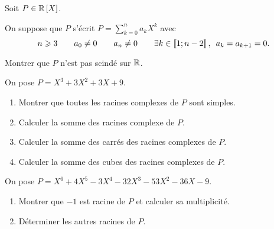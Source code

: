 \begin{exo}
Soit \(P\in\poly[\R]\).

On suppose que \(P\) s'écrit \(P=\sum_{k=0}^na_kX^k\) avec \[n\geq3\qquad a_0\not=0\qquad a_n\not=0\qquad\quantifs{\exists k\in\interventierii{1}{n-2}}a_k=a_{k+1}=0.\]

Montrer que \(P\) n'est pas scindé sur \(\mathbb{R}\).
\end{exo}

\begin{corr}
\end{corr}

\begin{exo}
On pose \(P=X^3+3X^2+3X+9\).

\begin{enumerate}
\item Montrer que toutes les racines complexes de \(P\) sont simples. \\

\item Calculer la somme des racines complexe de \(P\). \\

\item Calculer la somme des carrés des racines complexes de \(P\). \\

\item Calculer la somme des cubes des racines complexes de \(P\).
\end{enumerate}
\end{exo}

\begin{corr}
\end{corr}

\begin{exo}
On pose \(P=X^6+4X^5-3X^4-32X^3-53X^2-36X-9\).

\begin{enumerate}
\item Montrer que \(-1\) est racine de \(P\) et calculer sa multiplicité. \\

\item Déterminer les autres racines de \(P\).
\end{enumerate}
\end{exo}

\begin{corr}
\end{corr}

